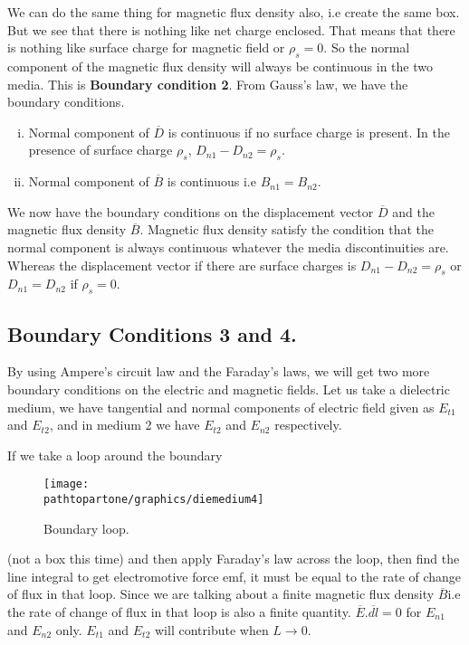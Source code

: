 We can do the same thing for magnetic flux density also, i.e create the same box. But we see that there is nothing like net charge enclosed. That means that there is nothing like surface charge for magnetic field or $\rho_s = 0$. So the normal component of the magnetic flux density will always be continuous in the two media. This is \textbf{Boundary condition 2}. From Gauss's law, we have the boundary conditions.
\begin{enumerate}[(i)]
\item Normal component of $\overline{D}$ is continuous if no surface charge is present. In the presence of surface charge $\rho_s$, $D_{n1}- D_{n2} = \rho_s$.
\item Normal component of $\overline{B}$ is continuous i.e $B_{n1} = B_{n2}$.
\end{enumerate}

We now have the boundary conditions on the displacement vector $\overline{D}$ and the magnetic flux density $\overline{B}$. Magnetic flux density satisfy the condition that the normal component is always continuous whatever the media discontinuities are. Whereas the displacement vector if there are surface charges  is $D_{n1}- D_{n2} = \rho_s$ or $D_{n1} = D_{n2} $ if $\rho_s = 0$. 
\subsection{Boundary Conditions 3 and 4.}
By using Ampere's circuit law and the Faraday's laws, we will get two more boundary conditions on the electric and magnetic fields. Let us take a dielectric medium, we have tangential and normal components of electric field given as $E_{t1}$ and $E_{t2}$, and in medium 2 we have $E_{t2}$ and $E_{n2}$ respectively.

If we take a loop around the boundary
\begin{figure}[h]
\centering
\texttt{[image: \\pathtopartone/graphics/diemedium4]}
\caption{Boundary loop.}
\end{figure}
(not a box this time) and then apply Faraday's law across the loop, then find the line integral to get electromotive force emf, it must be equal to the rate of change of flux in that loop. Since we are talking about a finite magnetic flux density $\overline{B}$i.e the rate of change of flux in that loop is also a finite quantity. $\overline{E}.\overline{dl} = 0$ for $E_{n1}$ and $E_{n2}$ only. $E_{t1}$ and $E_{t2}$ will contribute when $L \longrightarrow 0$. 

